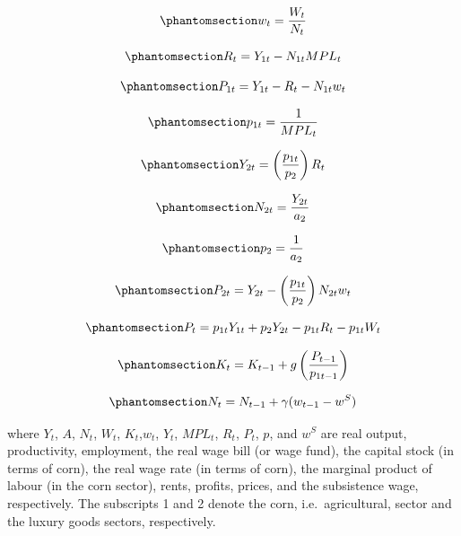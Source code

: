 \documentclass[
  letterpaper,
  DIV=11,
  numbers=noendperiod]{scrreprt}
\begin{document}
\begin{equation}\phantomsection\label{eq-ricardo2_w}{
w_t =\frac{W_t}{N_t}
}\end{equation}

\begin{equation}\phantomsection\label{eq-ricardo2_R}{
R_t =  Y_{1t} - N_{1t}MPL_{t}
}\end{equation}

\begin{equation}\phantomsection\label{eq-ricardo2_P1}{
P_{1t} = Y_{1t} - R_t - N_{1t}w_t
}\end{equation}

\begin{equation}\phantomsection\label{eq-ricardo2_p1}{
p_{1t}=\frac{1}{MPL_t}
}\end{equation}

\begin{equation}\phantomsection\label{eq-ricardo2_Y2}{
Y_{2t}=\left(\frac{p_{1t}}{p_{2}}\right)R_t
}\end{equation}

\begin{equation}\phantomsection\label{eq-ricardo2_N2}{
N_{2t} = \frac{Y_{2t}}{a_2}
}\end{equation}

\begin{equation}\phantomsection\label{eq-ricardo2_p2}{
p_{2}=\frac{1}{a_2}
}\end{equation}

\begin{equation}\phantomsection\label{eq-ricardo2_P2}{
P_{2t}=Y_{2t}-\left(\frac{p_{1t}}{p_{2}}\right)N_{2t}w_t
}\end{equation}

\begin{equation}\phantomsection\label{eq-ricardo2_P}{
P_{t}=p_{1t}Y_{1t}+p_{2}Y_{2t}-p_{1t}R_t -p_{1t}W_t
}\end{equation}

\begin{equation}\phantomsection\label{eq-ricardo2_K}{
K_t = K_{t-1} + g\left(\frac{P_{t-1}}{p_{1t-1}}\right)
}\end{equation}

\begin{equation}\phantomsection\label{eq-ricardo2_N}{
N_t = N_{t-1} + \gamma (w_{t-1} - w^S)
}\end{equation}

where \(Y_t\), \(A\), \(N_t\), \(W_t\), \(K_t\),\(w_t\), \(Y_t\),
\(MPL_t\), \(R_t\), \(P_t\), \(p\), and \(w^S\) are real output,
productivity, employment, the real wage bill (or wage fund), the capital
stock (in terms of corn), the real wage rate (in terms of corn), the
marginal product of labour (in the corn sector), rents, profits, prices,
and the subsistence wage, respectively. The subscripts 1 and 2 denote
the corn, i.e.~agricultural, sector and the luxury goods sectors,
respectively.
\end{document}
